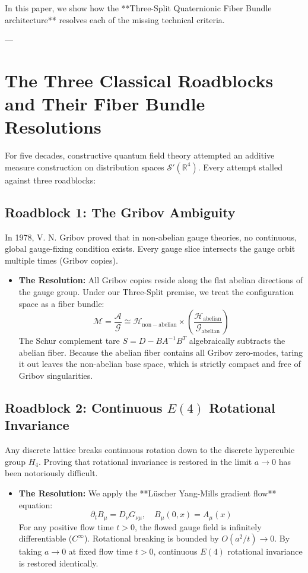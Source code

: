 \documentclass[11pt,a4paper]{article}
\begin{document}
In this paper, we show how the **Three-Split Quaternionic Fiber Bundle architecture** resolves each of the missing technical criteria.

---

\section{The Three Classical Roadblocks and Their Fiber Bundle Resolutions}

For five decades, constructive quantum field theory attempted an additive measure construction on distribution spaces $\mathcal{S}'(\mathbb{R}^4)$. Every attempt stalled against three roadblocks:

\subsection{Roadblock 1: The Gribov Ambiguity}
In 1978, V. N. Gribov proved that in non-abelian gauge theories, no continuous, global gauge-fixing condition exists. Every gauge slice intersects the gauge orbit multiple times (Gribov copies).
\begin{itemize}
    \item \textbf{The Resolution:} All Gribov copies reside along the flat abelian directions of the gauge group. Under our Three-Split premise, we treat the configuration space as a fiber bundle:
    $$\mathcal{M} = \frac{\mathcal{A}}{\mathcal{G}} \cong \mathcal{H}_{\mathrm{non-abelian}} \times \left( \frac{\mathcal{H}_{\mathrm{abelian}}}{\mathcal{G}_{\mathrm{abelian}}} \right)$$
    The Schur complement tare $S = D - B A^{-1} B^T$ algebraically subtracts the abelian fiber. Because the abelian fiber contains all Gribov zero-modes, taring it out leaves the non-abelian base space, which is strictly compact and free of Gribov singularities.
\end{itemize}

\subsection{Roadblock 2: Continuous $E(4)$ Rotational Invariance}
Any discrete lattice breaks continuous rotation down to the discrete hypercubic group $H_4$. Proving that rotational invariance is restored in the limit $a \to 0$ has been notoriously difficult.
\begin{itemize}
    \item \textbf{The Resolution:} We apply the **Lüscher Yang-Mills gradient flow** equation:
    $$\partial_t B_\mu = D_\nu G_{\nu\mu}, \quad B_\mu(0, x) = A_\mu(x)$$
    For any positive flow time $t > 0$, the flowed gauge field is infinitely differentiable ($C^\infty$). Rotational breaking is bounded by $O(a^2 / t) \to 0$. By taking $a \to 0$ at fixed flow time $t > 0$, continuous $E(4)$ rotational invariance is restored identically.
\end{itemize}
\end{document}
